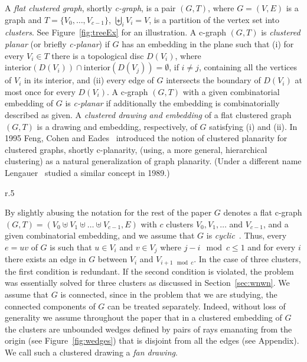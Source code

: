 \documentclass{llncs}
\newif\iflong
\begin{document}
 


A \emph{flat clustered graph}, shortly  \emph{c-graph}, is a pair $(G,T)$, where $G=(V,E)$ is a graph and $T=\{V_0, \ldots, V_{c-1}\}$, $\biguplus_i V_i=V$, is a partition of the
vertex set into \emph{clusters}. See Figure~\ref{fig:treeEx} for an illustration.
A  c-graph $(G,T)$ is \emph{clustered planar} (or briefly \emph{c-planar}) if $G$ has an
 embedding in the plane such that (i)
for every $V_i\in T$ there is a topological disc $D(V_i)$, where $\mathrm{interior}(D(V_i))\cap \mathrm{interior} (D(V_j))=\emptyset$, if $i\not=j$,
 containing all the vertices of $V_i$ in its interior, and (ii)
 every edge of $G$ intersects the boundary of $D(V_i)$ at most once for every $D(V_i)$.
A c-graph  $(G,T)$ with a given combinatorial embedding of $G$ is \emph{c-planar} 
if additionally the embedding is combinatorially described as given.
 A \emph{clustered drawing and embedding} of a flat clustered graph $(G,T)$ is a drawing and embedding, respectively,
 of $G$ satisfying (i) and (ii).
In 1995
 Feng, Cohen and Eades~\cite{FCEa95,FCEb95} introduced the notion of clustered planarity for clustered graphs, shortly c-planarity, (using, a more general, hierarchical clustering)
as a natural generalization of graph planarity. (Under a different name
Lengauer~\cite{L89} studied a similar concept in 1989.)


\begin{wrapfigure}{r}{.5\textwidth}
  \centering
\centering
{}
\caption{A c-graph that is not c-planar (left); and a c-planar c-graph (right).}
\label{fig:treeEx}
\end{wrapfigure}

By slightly abusing the notation for the rest of the paper $G$ denotes  a flat c-graph $(G,T)=(V_0 \uplus V_1 \uplus \ldots \uplus V_{c-1}, E)$ with $c$ clusters
$V_0,V_1,\ldots $ and $V_{c-1}$, and a given combinatorial embedding, and we assume that $G$ is \emph{cyclic}~\cite[Section 6]{FKMP15}. Thus, every $e=uv$ of $G$ is such that
$u\in V_i$ and $v\in V_j$ where $j-i \mod c \le 1$ and for every
$i$ there exists an edge in $G$ between $V_i$ and $V_{i+1 \mod c}$.
In the case of three clusters, the first condition is redundant.
If the second condition is violated, the problem was essentially solved for three clusters as discussed in
Section~\ref{sec:wnwn}.
We assume that $G$ is connected, since in the problem that we are studying, the connected components of $G$ can be treated separately. Indeed, \iflong as we show in Section~\ref{sec:fan} \fi without loss of generality  we  assume throughout the paper that in a clustered embedding of $G$ the clusters are unbounded wedges defined by pairs of rays emanating from the origin (see Figure~\ref{fig:wedges}) that is disjoint from all the edges (see Appendix). We call such a clustered drawing  a \emph{fan drawing}. \\
\end{document}
